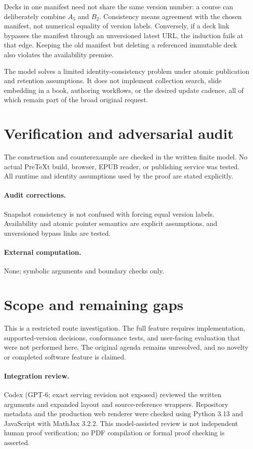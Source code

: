 \documentclass[11pt]{article}
\begin{document}
Decks in one manifest need not share the same version number: a course can deliberately combine $A_5$ and $B_2$. Consistency means agreement with the chosen manifest, not numerical equality of version labels. Conversely, if a deck link bypasses the manifest through an unversioned latest URL, the induction fails at that edge. Keeping the old manifest but deleting a referenced immutable deck also violates the availability premise.

The model solves a limited identity-consistency problem under atomic publication and retention assumptions. It does not implement collection search, slide embedding in a book, authoring workflows, or the desired update cadence, all of which remain part of the broad original request.
\section{Verification and adversarial audit}
The construction and counterexample are checked in the written finite model. No actual PreTeXt build, browser, EPUB reader, or publishing service was tested. All runtime and identity assumptions used by the proof are stated explicitly.
\paragraph{Audit corrections.} Snapshot consistency is not confused with forcing equal version labels. Availability and atomic pointer semantics are explicit assumptions, and unversioned bypass links are tested.
\paragraph{External computation.} None; symbolic arguments and boundary checks only.
\section{Scope and remaining gaps}
This is a restricted route investigation. The full feature requires implementation, supported-version decisions, conformance tests, and user-facing evaluation that were not performed here. The original agenda remains unresolved, and no novelty or completed software feature is claimed.
\paragraph{Integration review.} Codex (GPT-6; exact serving revision not exposed) reviewed the written arguments and expanded layout and source-reference wrappers. Repository metadata and the production web renderer were checked using Python 3.13 and JavaScript with MathJax 3.2.2. This model-assisted review is not independent human proof verification; no PDF compilation or formal proof checking is asserted.
\end{document}
